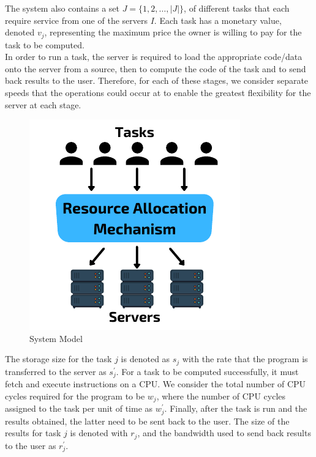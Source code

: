 The system also contains a set $J = \{1,2,\ldots,\left| J \right|\}$, of different tasks that each require service from
one of the servers $I$. Each task has a monetary value, denoted $v_j$, representing the maximum price the owner is
willing to pay for the task to be computed. \\
In order to run a task, the server is required to load the appropriate code/data onto the server from a source, then to
compute the code of the task and to send back results to the user. Therefore, for each of these stages, we consider
separate speeds that the operations could occur at to enable the greatest flexibility for the server at each stage. \\
\begin{figure}
    \centering
    \includegraphics[width=\linewidth]{figs/system_model.pdf}
    \caption{System Model}
    \label{fig:system-model}
\end{figure}
The storage size for the task $j$ is denoted as $s_j$ with the rate that the program is transferred to the server
as $s^{'}_j$. For a task to be computed successfully, it must fetch and execute instructions on a CPU. We consider the
total number of CPU cycles required for the program to be $w_j$, where the number of CPU cycles assigned to the task
per unit of time as $w^{'}_j$. Finally, after the task is run and the results obtained, the latter need to be sent back
to the user. The size of the results for task $j$ is denoted with $r_j$, and the bandwidth used to send back results to
the user as $r^{'}_j$.

